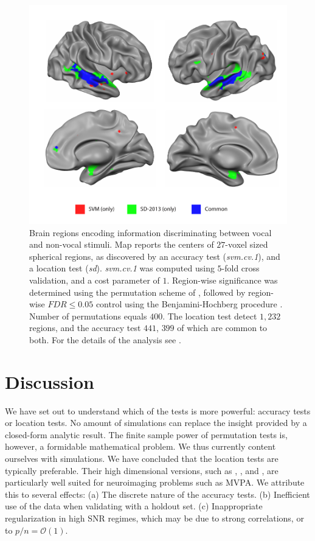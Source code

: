 \documentclass[12pt,a4paper]{article}
\begin{document}
\begin{figure}[th]
\centering
\includegraphics[width=0.7\linewidth]{"art/svm_vs_SD"}
\caption{\footnotesize
Brain regions encoding information discriminating between vocal and non-vocal stimuli.
Map reports the centers of $27$-voxel sized spherical regions, as discovered by an accuracy test (\emph{svm.cv.1}), and a location test (\emph{sd}). 
\emph{svm.cv.1} was computed using $5$-fold cross validation, and a cost parameter of $1$. 
Region-wise significance was determined using the permutation scheme of \cite{stelzer_statistical_2013}, followed by region-wise $FDR \leq 0.05$ control using the Benjamini-Hochberg procedure \citep{benjamini_controlling_1995}.
Number of permutations equals $400$.
The location test detect $1,232$ regions, and the accuracy test $441$, $399$ of which are common to both.
For the details of the analysis see \cite{gilron_quantifying_2016}.  
  }
\label{fig:read_data}
\end{figure}








\section{Discussion}
\label{sec:discussion}

We have set out to understand which of the tests is more powerful: accuracy tests or location tests. 
No amount of simulations can replace the insight provided by a closed-form analytic result. 
The finite sample power of permutation tests is, however, a formidable mathematical problem. We thus currently content ourselves with simulations.
We have concluded that the location tests are typically preferable. 
Their high dimensional versions, such as \cite{schafer_shrinkage_2005}, \cite{goeman2006testing}, and \cite{srivastava_multivariate_2007},  are particularly well suited for neuroimaging problems such as MVPA.
We attribute this to several effects: \newline
(a) The discrete nature of the accuracy tests. \newline
(b) Inefficient use of the data when validating with a holdout set. \newline
(c) Inappropriate regularization in high SNR regimes, which may be due to strong correlations, or to $p/n=\mathcal{O}(1)$. \newline
\end{document}
